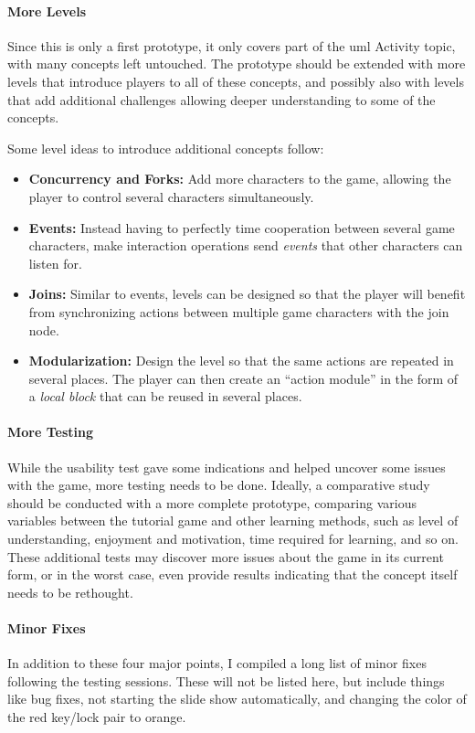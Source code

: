 \paragraph{More Levels} Since this is only a first prototype, it only covers part of the \gls{uml} Activity topic, with many concepts left untouched. The prototype should be extended with more levels that introduce players to all of these concepts, and possibly also with levels that add additional challenges allowing deeper understanding to some of the concepts.

\noindent
Some level ideas to introduce additional concepts follow:
\begin{itemize}
	\item{\textbf{Concurrency and Forks:}} Add more characters to the game, allowing the player to control several characters simultaneously.
	\item{\textbf{Events:}} Instead having to perfectly time cooperation between several game characters, make interaction operations send \emph{events} that other characters can listen for.
	\item{\textbf{Joins:}} Similar to events, levels can be designed so that the player will benefit from synchronizing actions between multiple game characters with the join node.
	\item{\textbf{Modularization:}} Design the level so that the same actions are repeated in several places. The player can then create an ``action module'' in the form of a \emph{local block} that can be reused in several places.
\end{itemize}

\paragraph{More Testing} While the usability test gave some indications and helped uncover some issues with the game, more testing needs to be done. Ideally, a comparative study should be conducted with a more complete prototype, comparing various variables between the tutorial game and other learning methods, such as level of understanding, enjoyment and motivation, time required for learning, and so on. These additional tests may discover more issues about the game in its current form, or in the worst case, even provide results indicating that the concept itself needs to be rethought.

\paragraph{Minor Fixes} In addition to these four major points, I compiled a long list of minor fixes following the testing sessions. These will not be listed here, but include things like bug fixes, not starting the slide show automatically, and changing the color of the red key/lock pair to orange.

